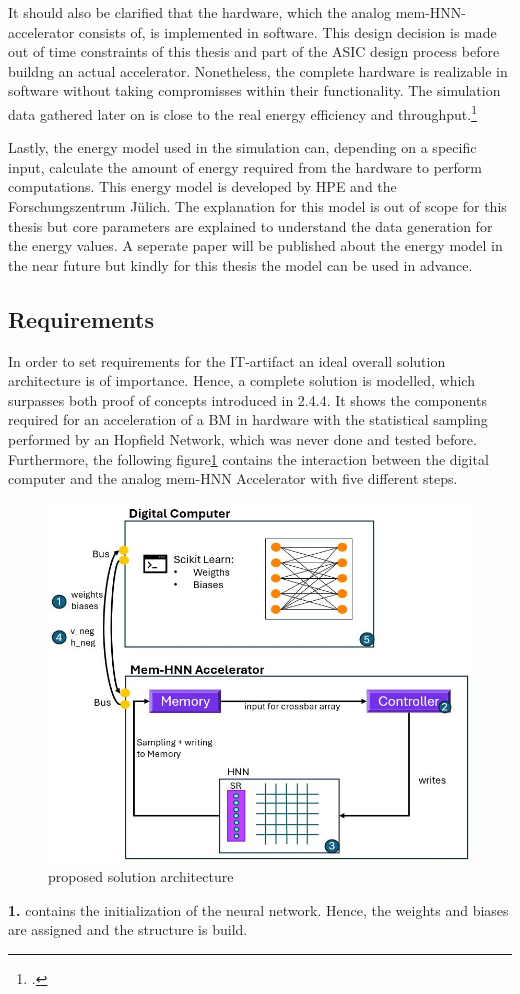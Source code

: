 It should also be clarified that the hardware, which the analog \ac{mem-HNN}-accelerator consists of, is implemented in software. 
This design decision is made out of time constraints of this thesis and part of the ASIC design process before buildng an actual accelerator. 
Nonetheless, the complete hardware is realizable in software without taking compromisses within their functionality.
The simulation data gathered later on is close to the real energy efficiency and throughput.\footcite[cf.][3-4]{hizzaniMemristorbasedHardwareAlgorithms2023} 


Lastly, the energy model used in the simulation can, depending on a specific input, calculate the amount of energy required from the hardware to perform computations.
This energy model is developed by HPE and the Forschungszentrum Jülich.
The explanation for this model is out of scope for this thesis but core parameters are explained to understand the data generation for the energy values.
A seperate paper will be published about the energy model in the near future but kindly for this thesis the model can be used in advance.

\subsection{Requirements}

In order to set requirements for the IT-artifact an ideal overall solution architecture is of importance. 
Hence, a complete solution is modelled, which surpasses both proof of concepts introduced in 2.4.4.
It shows the components required for an acceleration of a \ac{BM} in hardware with the statistical sampling performed by an Hopfield Network, which was never done and tested before.
Furthermore, the following figure\ref{Overall architecture} contains the interaction between the digital computer and the analog mem-HNN Accelerator with five different steps. 
\begin{figure}[H]
    \centering
    \includegraphics[width=0.80\linewidth]{graphics/Analysemodell.JPG}
    \caption{proposed solution architecture}
    \label{Overall architecture}
\end{figure}
\textbf{1.} contains the initialization of the neural network. 
Hence, the weights and biases are assigned and the structure is build.

